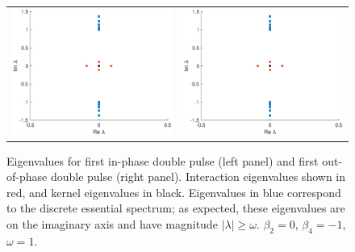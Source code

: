 \documentclass[12pt]{article}
\begin{document}
\begin{figure}[H]
\centering
\begin{tabular}{cc}
\includegraphics[width=8cm]{images/inteigsDP1plus.eps} &
\includegraphics[width=8cm]{images/inteigsDP1plus.eps}
\end{tabular}
\caption{Eigenvalues for first in-phase double pulse (left panel)  and first out-of-phase double pulse (right panel). Interaction eigenvalues shown in red, and kernel eigenvalues in black. Eigenvalues in blue correspond to the discrete essential spectrum; as expected, these eigenvalues are on the imaginary axis and have magnitude $|\lambda| \geq \omega$. $\beta_2 = 0$, $\beta_4 = -1$, $\omega = 1$. }
\label{fig:doublespec}
\end{figure} 




% 

\end{document}

